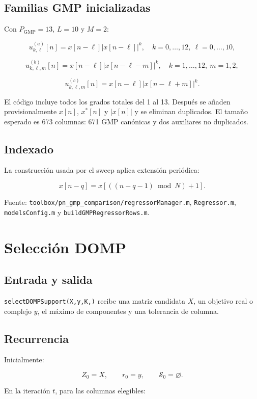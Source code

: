 \documentclass[10pt,a4paper]{article}
\newcommand{\code}[1]{\texttt{#1}}
\begin{document}
\subsection{Familias GMP inicializadas}

Con \(P_{\mathrm{GMP}}=13\), \(L=10\) y \(M=2\):

\[
u^{(a)}_{k,\ell}[n]
=x[n-\ell]|x[n-\ell]|^k,
\quad
k=0,\ldots,12,\ \ell=0,\ldots,10,
\]

\[
u^{(b)}_{k,\ell,m}[n]
=x[n-\ell]|x[n-\ell-m]|^k,
\quad
k=1,\ldots,12,\ m=1,2,
\]

\[
u^{(c)}_{k,\ell,m}[n]
=x[n-\ell]|x[n-\ell+m]|^k.
\]

El código incluye todos los grados totales del 1 al 13. Después se añaden
provisionalmente \(x[n]\), \(x^*[n]\) y \(|x[n]|\) y se eliminan duplicados.
El tamaño esperado es 673 columnas: 671 GMP canónicas y dos auxiliares no
duplicados.

\subsection{Indexado}

La construcción usada por el sweep aplica extensión periódica:

\[
x[n-q]=x[((n-q-1)\bmod N)+1].
\]

Fuente:
\code{toolbox/pn\_gmp\_comparison/regressorManager.m},
\code{Regressor.m},
\code{modelsConfig.m} y
\code{buildGMPRegressorRows.m}.

\section{Selección DOMP}

\subsection{Entrada y salida}

\code{selectDOMPSupport(X,y,K,\tau)} recibe una matriz candidata \(X\), un
objetivo real o complejo \(y\), el máximo de componentes y una tolerancia de
columna.

\subsection{Recurrencia}

Inicialmente:

\[
Z_0=X,\qquad r_0=y,\qquad\mathcal S_0=\varnothing.
\]

En la iteración \(t\), para las columnas elegibles:
\end{document}
